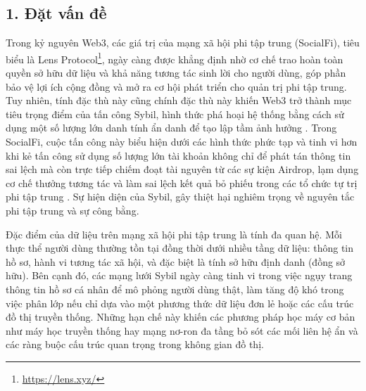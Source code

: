 \subsection{1. Đặt vấn đề}

\indent\indent Trong kỷ nguyên Web3, các giá trị của mạng xã hội phi tập trung (SocialFi), tiêu biểu là Lens Protocol\footnote{\url{https://lens.xyz/}}, ngày càng được khẳng định nhờ cơ chế trao hoàn toàn quyền sở hữu dữ liệu và khả năng tương tác sinh lời cho người dùng, góp phần bảo vệ lợi ích cộng đồng và mở ra cơ hội phát triển cho quản trị phi tập trung. Tuy nhiên, tính đặc thù này cũng chính đặc thù này khiến Web3 trở thành mục tiêu trọng điểm của tấn công Sybil, hình thức phá hoại hệ thống bằng cách sử dụng một số lượng lớn danh tính ẩn danh để tạo lập tầm ảnh hưởng \cite{al2017sybil}. Trong SocialFi, cuộc tấn công này biểu hiện dưới các hình thức phức tạp và tinh vi hơn khi kẻ tấn công sử dụng số lượng lớn tài khoản không chỉ để phát tán thông tin sai lệch mà còn trực tiếp chiếm đoạt tài nguyên từ các sự kiện Airdrop, lạm dụng cơ chế thưởng tương tác và làm sai lệch kết quả bỏ phiếu trong các tổ chức tự trị phi tập trung \cite{liu2025detecting}. Sự hiện diện của Sybil, gây thiệt hại nghiêm trọng về nguyên tắc phi tập trung và sự công bằng.\vspace{0.3cm}

Đặc điểm của dữ liệu trên mạng xã hội phi tập trung là tính đa quan hệ. Mỗi thực thể người dùng thường tồn tại đồng thời dưới nhiều tầng dữ liệu: thông tin hồ sơ, hành vi tương tác xã hội, và đặc biệt là tính sở hữu định danh (đồng sở hữu). Bên cạnh đó, các mạng lưới Sybil ngày càng tinh vi trong việc ngụy trang thông tin hồ sơ cá nhân để mô phỏng người dùng thật, làm tăng độ khó trong việc phân lớp nếu chỉ dựa vào một phương thức dữ liệu đơn lẻ hoặc các cấu trúc đồ thị truyền thống. Những hạn chế này khiến các phương pháp học máy cơ bản như máy học truyền thống hay mạng nơ-ron đa tầng bỏ sót các mối liên hệ ẩn và các ràng buộc cấu trúc quan trọng trong không gian đồ thị.\vspace{0.3cm}

